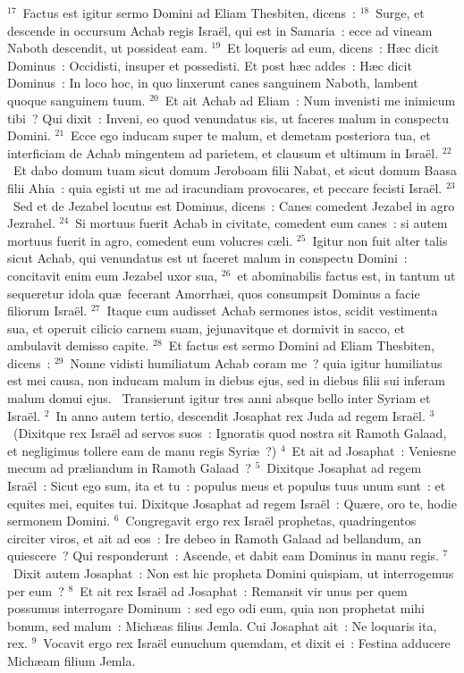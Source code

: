 ${}^{17}$~Factus est igitur sermo Domini ad Eliam Thesbiten, dicens~:
${}^{18}$~Surge, et descende in occursum Achab regis Isra\"el, qui est in Samaria~: ecce ad vineam Naboth descendit, ut possideat eam.
${}^{19}$~Et loqueris ad eum, dicens~: H\ae c dicit Dominus~: Occidisti, insuper et possedisti. Et post h\ae c addes~: H\ae c dicit Dominus~: In loco hoc, in quo linxerunt canes sanguinem Naboth, lambent quoque sanguinem tuum.
${}^{20}$~Et ait Achab ad Eliam~: Num invenisti me inimicum tibi~? Qui dixit~: Inveni, eo quod venundatus sis, ut faceres malum in conspectu Domini.
${}^{21}$~Ecce ego inducam super te malum, et demetam posteriora tua, et interficiam de Achab mingentem ad parietem, et clausum et ultimum in Isra\"el.
${}^{22}$~Et dabo domum tuam sicut domum Jeroboam filii Nabat, et sicut domum Baasa filii Ahia~: quia egisti ut me ad iracundiam provocares, et peccare fecisti Isra\"el.
${}^{23}$~Sed et de Jezabel locutus est Dominus, dicens~: Canes comedent Jezabel in agro Jezrahel.
${}^{24}$~Si mortuus fuerit Achab in civitate, comedent eum canes~: si autem mortuus fuerit in agro, comedent eum volucres c\ae li.
${}^{25}$~Igitur non fuit alter talis sicut Achab, qui venundatus est ut faceret malum in conspectu Domini~: concitavit enim eum Jezabel uxor sua,
${}^{26}$~et abominabilis factus est, in tantum ut sequeretur idola qu\ae\ fecerant Amorrh\ae i, quos consumpsit Dominus a facie filiorum Isra\"el.
${}^{27}$~Itaque cum audisset Achab sermones istos, scidit vestimenta sua, et operuit cilicio carnem suam, jejunavitque et dormivit in sacco, et ambulavit demisso capite.
${}^{28}$~Et factus est sermo Domini ad Eliam Thesbiten, dicens~:
${}^{29}$~Nonne vidisti humiliatum Achab coram me~? quia igitur humiliatus est mei causa, non inducam malum in diebus ejus, sed in diebus filii sui inferam malum domui ejus.
~\lettrine[lines=10,image=true,loversize=0.05,lraise=-0.03]{T}{}ransierunt igitur tres anni absque bello inter Syriam et Isra\"el.
${}^{2}$~In anno autem tertio, descendit Josaphat rex Juda ad regem Isra\"el.
${}^{3}$~(Dixitque rex Isra\"el ad servos suos~: Ignoratis quod nostra sit Ramoth Galaad, et negligimus tollere eam de manu regis Syri\ae~?)
${}^{4}$~Et ait ad Josaphat~: Veniesne mecum ad pr\ae liandum in Ramoth Galaad~?
${}^{5}$~Dixitque Josaphat ad regem Isra\"el~: Sicut ego sum, ita et tu~: populus meus et populus tuus unum sunt~: et equites mei, equites tui. Dixitque Josaphat ad regem Isra\"el~: Qu\ae re, oro te, hodie sermonem Domini.
${}^{6}$~Congregavit ergo rex Isra\"el prophetas, quadringentos circiter viros, et ait ad eos~: Ire debeo in Ramoth Galaad ad bellandum, an quiescere~? Qui responderunt~: Ascende, et dabit eam Dominus in manu regis.
${}^{7}$~Dixit autem Josaphat~: Non est hic propheta Domini quispiam, ut interrogemus per eum~?
${}^{8}$~Et ait rex Isra\"el ad Josaphat~: Remansit vir unus per quem possumus interrogare Dominum~: sed ego odi eum, quia non prophetat mihi bonum, sed malum~: Mich\ae as filius Jemla. Cui Josaphat ait~: Ne loquaris ita, rex.
${}^{9}$~Vocavit ergo rex Isra\"el eunuchum quemdam, et dixit ei~: Festina adducere Mich\ae am filium Jemla.


